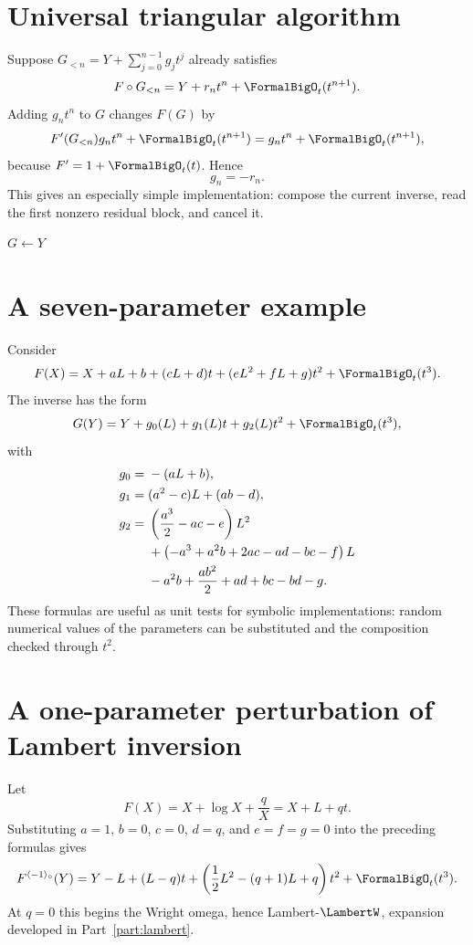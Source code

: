 \documentclass[11pt,oneside]{book}
\theoremstyle{definition}
\theoremstyle{remark}
\newcommand{\compinv}{^{\langle-1\rangle_{\circ}}}
\newcommand{\compose}{\mathbin{\circ}}
\newcommand{\trunc}[2]{\left[#1\right]_{\le #2}}
\begin{document}
\section{Universal triangular algorithm}
Suppose $G_{<n}=Y+\sum_{j=0}^{n-1}g_jt^j$ already satisfies
\[
 F\compose G_{<n}=Y+r_nt^n+\FormalBigO_t(t^{n+1}).
\]
Adding $g_nt^n$ to $G$ changes $F(G)$ by
\[
 F'(G_{<n})g_nt^n+\FormalBigO_t(t^{n+1})
 =g_nt^n+\FormalBigO_t(t^{n+1}),
\]
because $F'=1+\FormalBigO_t(t)$.  Hence
\begin{equation}\label{eq:triangular-next-block}
 g_n=-r_n.
\end{equation}
This gives an especially simple implementation: compose the current inverse,
read the first nonzero residual block, and cancel it.

\begin{algorithm}[H]
\caption{Residual-cancellation series reversal}
\label{alg:triangular-reversal}
\KwOut{$G=\trunc{F\compinv}{N}$}
$G\leftarrow Y$\;
\For{$n\leftarrow0$ \KwTo $N$}{
  $R\leftarrow\trunc{F\compose G-Y}{n}$\;
  $r_n\leftarrow[t^n]R$\;
  $G\leftarrow G-r_nt^n$\;
}
\;
\end{algorithm}

\section{A seven-parameter example}
Consider
\begin{equation}\label{eq:parametric-F}
 F(X)=X+aL+b+(cL+d)t+(eL^2+fL+g)t^2+\FormalBigO_t(t^3).
\end{equation}
The inverse has the form
\[
 G(Y)=Y+g_0(L)+g_1(L)t+g_2(L)t^2+\FormalBigO_t(t^3),
\]
with
\begin{align}
 g_0={}&-(aL+b),\label{eq:param-g0}\\
 g_1={}&(a^2-c)L+(ab-d),\label{eq:param-g1}\\
 g_2={}&\left(\frac{a^3}{2}-ac-e\right)L^2\notag\\
 &+\left(-a^3+a^2b+2ac-ad-bc-f\right)L\notag\\
 &-a^2b+\frac{ab^2}{2}+ad+bc-bd-g.
 \label{eq:param-g2}
\end{align}
These formulas are useful as unit tests for symbolic implementations: random
numerical values of the parameters can be substituted and the composition
checked through $t^2$.

\section{A one-parameter perturbation of Lambert inversion}
Let
\begin{equation}\label{eq:F-log-q}
 F(X)=X+\log X+\frac{q}{X}=X+L+qt.
\end{equation}
Substituting $a=1$, $b=0$, $c=0$, $d=q$, and $e=f=g=0$ into the preceding
formulas gives
\begin{equation}\label{eq:inverse-log-q}
 F\compinv(Y)
 =Y-L+(L-q)t
 +\left(\frac12L^2-(q+1)L+q\right)t^2
 +\FormalBigO_t(t^3).
\end{equation}
At $q=0$ this begins the Wright omega, hence Lambert-$\LambertW$, expansion developed
in Part~\ref{part:lambert}.
\end{document}
